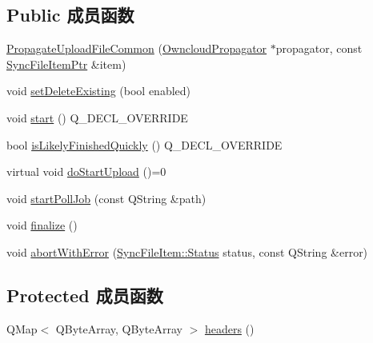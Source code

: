 \subsection*{Public 成员函数}
\begin{DoxyCompactItemize}
\item 
\hyperlink{class_o_c_c_1_1_propagate_upload_file_common_a2d14665339c7b4d0cdc8f9ff8c45fa66}{Propagate\+Upload\+File\+Common} (\hyperlink{class_o_c_c_1_1_owncloud_propagator}{Owncloud\+Propagator} $\ast$propagator, const \hyperlink{namespace_o_c_c_acb6b0db82893659fbd0c98d3c5b8e2b8}{Sync\+File\+Item\+Ptr} \&item)
\item 
void \hyperlink{class_o_c_c_1_1_propagate_upload_file_common_a93895c48e6b9bbf7798e8527213abcd9}{set\+Delete\+Existing} (bool enabled)
\item 
void \hyperlink{class_o_c_c_1_1_propagate_upload_file_common_a588514bbae3f7655a7b9dba85fb6af62}{start} () Q\+\_\+\+D\+E\+C\+L\+\_\+\+O\+V\+E\+R\+R\+I\+DE
\item 
bool \hyperlink{class_o_c_c_1_1_propagate_upload_file_common_a1701db58050bde4a96816d7da7ad0430}{is\+Likely\+Finished\+Quickly} () Q\+\_\+\+D\+E\+C\+L\+\_\+\+O\+V\+E\+R\+R\+I\+DE
\item 
virtual void \hyperlink{class_o_c_c_1_1_propagate_upload_file_common_a7df70722c1bc35b534d7cd1829abe8f5}{do\+Start\+Upload} ()=0
\item 
void \hyperlink{class_o_c_c_1_1_propagate_upload_file_common_ae4261f390df2d2ed73a16f0e4fcf71aa}{start\+Poll\+Job} (const Q\+String \&path)
\item 
void \hyperlink{class_o_c_c_1_1_propagate_upload_file_common_af7ccc7680c669f640ecd3bd40ee5e834}{finalize} ()
\item 
void \hyperlink{class_o_c_c_1_1_propagate_upload_file_common_a713ee758b6e2ee3a0573a355cb96192f}{abort\+With\+Error} (\hyperlink{class_o_c_c_1_1_sync_file_item_a149ade86eddd9661587bfbc9bcbca408}{Sync\+File\+Item\+::\+Status} status, const Q\+String \&error)
\end{DoxyCompactItemize}
\subsection*{Protected 成员函数}
\begin{DoxyCompactItemize}
\item 
Q\+Map$<$ Q\+Byte\+Array, Q\+Byte\+Array $>$ \hyperlink{class_o_c_c_1_1_propagate_upload_file_common_a70de38935ddd7eabe60ae08df6e880c4}{headers} ()
\end{DoxyCompactItemize}
